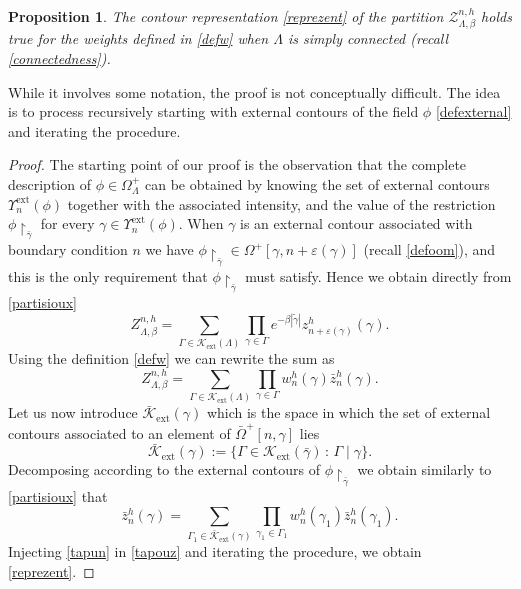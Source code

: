 \documentclass[10pt]{amsart}
\let\mathcal\mathscr
\newcommand{\sep}{\,:\,}
\numberwithin{equation}{section}
\theoremstyle{plain}
\newtheorem{proposition}[theorem]{Proposition}
\theoremstyle{definition}
\newcommand{\ext}{\mathrm{ext}}
\newcommand{\restrict}{\!\!\upharpoonright}
\newcommand{\cZ}{{\ensuremath{\mathcal Z}} }
\newcommand{\cK}{{\ensuremath{\mathcal K}} }
\newcommand{\gb}{\beta}
\newcommand{\gep}{\varepsilon}
\newcommand{\gG}{\Gamma}
\newcommand{\gO}{\Omega}
\newcommand{\gL}{\Lambda}
\begin{document}
\begin{proposition}\label{trax}
The contour representation \eqref{reprezent} of the partition $\cZ^{n,h}_{\gL,\gb}$ holds true for the weights defined in \eqref{defw}
when $\gL$ is simply connected (recall \eqref{connectedness}).
\end{proposition}

While it involves some notation, the proof is not conceptually difficult.
The idea is to process recursively starting with external contours of the field $\phi$ \eqref{defexternal} and iterating the procedure.

\begin{proof}

The starting point of our proof is the observation that the complete descrip\-tion of
$\phi\in \gO^+_{\gL}$ can be obtained by knowing the set of external contours $\Upsilon^{\ext}_n(\phi)$ together with the associated intensity,
and the value of the restriction $\phi\restrict_{\bar \gamma}$ for every $\gamma\in \Upsilon^{\ext}_n(\phi)$.
When $\gamma$ is an external contour associated with boundary condition $n$ we have
$\phi\restrict_{\bar \gamma}\in \gO^+[\gamma,n+\gep(\gamma)]$ (recall \eqref{defoom}), and this is the only requirement that $\phi\restrict_{\bar \gamma}$
must satisfy.
Hence we obtain directly from \eqref{partisioux}
\begin{equation*}%
Z^{n,h}_{\gL,\gb}
=\sum_{\gG\in \cK_{\ext}(\gL)}\prod_{\gamma\in \gG} e^{-\gb |\tilde \gamma|} z^h_{n+\gep(\gamma)}(\gamma).
\end{equation*}
Using the definition \eqref{defw} we can rewrite the sum as
\begin{equation}\label{tapouz}
Z^{n,h}_{\gL,\gb}
=\sum_{\gG\in \cK_{\ext}(\gL)}\prod_{\gamma\in \gG} w^h_n(\gamma) \bar z^h_n(\gamma).
\end{equation}
Let us now introduce $\bar \cK_{\ext}(\gamma)$ which is the space in which the set of external contours associated to an element of $\bar \gO^+[n,\gamma]$ lies
\begin{equation}\label{daext}
\bar \cK_{\ext}(\gamma):=\{ \gG \in \cK_{\ext}(\bar \gamma) \sep \gG \mid \gamma \}.
\end{equation}
Decomposing according to the external contours of $\phi\restrict_{\bar \gamma}$ we obtain similarly to \eqref{partisioux} that
\begin{equation}\label{tapun}
\bar z^h_n(\gamma)= \sum_{\gG_1\in \bar \cK_{\ext}(\gamma)}\prod_{\gamma_1\in \gG_1}
w^h_n(\gamma_1) \bar z^h_n(\gamma_1).
\end{equation}
Injecting \eqref{tapun} in \eqref{tapouz} and iterating the procedure, we obtain \eqref{reprezent}.
\end{proof}
\end{document}
